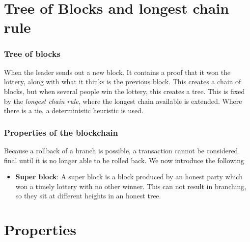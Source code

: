 \section{Tree of Blocks and longest chain rule}
        \begin{frame}
            \frametitle{Tree of blocks}
                When the leader sends out a new block. It contains a proof that it won the lottery, along with what it thinks is the previous block. This creates a chain of blocks, but when several people win the lottery, this creates a tree. This is fixed by the \textit{longest chain rule}, where the longest chain available is extended. Where there is a tie, a deterministic heuristic is used. 
        \end{frame}
        \begin{frame}
            \frametitle{Properties of the blockchain}
                Because a rollback of a branch is possible, a transaction cannot be considered final until it is no longer able to be rolled back. We now introduce the following
                \begin{itemize}
                   \item \textbf{Super block}: A super block is a block produced by an honest party which won a timely lottery with no other winner. This can not result in branching, so they sit at different heights in an honest tree.  
                \end{itemize}
            
        
        \end{frame}



\section{Properties}



